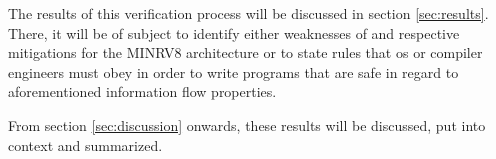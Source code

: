 The results of this verification process will be discussed in section \ref{sec:results}.
There, it will be of subject to identify either weaknesses of and respective mitigations for the MINRV8 architecture or to state rules that \gls{os} or compiler engineers must obey in order to write programs that are safe in regard to aforementioned information flow properties.

From section \ref{sec:discussion} onwards, these results will be discussed, put into context and summarized.
